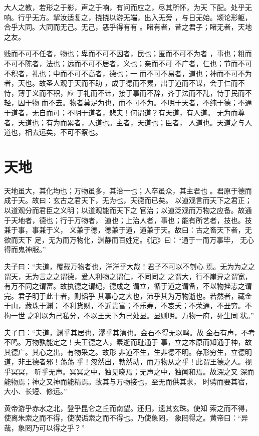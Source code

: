 \documentclass[12pt,UTF8]{ctexbook}
\begin{document}
大人之教，若形之于影，声之于响，有问而应之，尽其所怀，为天 下配。处乎无响。行乎无方。挈汝适复之，挠挠以游无端，出入无旁 ，与日无始。颂论形躯，合乎大同。大同而无己。无己，恶乎得有有 。睹有者，昔之君子；睹无者，天地之友。

贱而不可不任者，物也；卑而不可不因者，民也；匿而不可不为者 ，事也；粗而不可不陈者，法也；远而不可不居者，义也；亲而不可 不广者，仁也；节而不可不积者，礼也；中而不可不高者，德也；一 而不可不易者，道也；神而不可不为者，天也。故圣人观于天而不助 ，成于德而不累，出于道而不谋，会于仁而不恃，薄于义而不积，应 于礼而不讳，接于事而不辞，齐于法而不乱，恃于民而不轻，因于物 而不去。物者莫足为也，而不可不为。不明于天者，不纯于德；不通 于道者，无自而可；不明于道者，悲夫！何谓道？有天道，有人道。 无为而尊者，天道也；有为而累者，人道也。主者，天道也；臣者， 人道也。天道之与人道也，相去远矣，不可不察也。

\section{天地}

天地虽大，其化均也；万物虽多，其治一也；人卒虽众，其主君也 。君原于德而成于天。故曰：玄古之君天下，无为也，天德而已矣。 以道观言而天下之君正；以道观分而君臣之义明；以道观能而天下之 官治；以道泛观而万物之应备。故通于天地者，德也；行于万物者， 道也；上治人者，事也；能有所艺者，技也。技兼于事，事兼于义， 义兼于德，德兼于道，道兼于天。故曰：古之畜天下者，无欲而天下 足，无为而万物化，渊静而百姓定。《记》曰：“通于一而万事毕， 无心得而鬼神服。”

夫子曰：“夫道，覆载万物者也，洋洋乎大哉！君子不可以不刳心 焉。无为为之之谓天，无为言之之谓德，爱人利物之谓仁，不同同之 之谓大，行不崖异之谓宽，有万不同之谓富。故执德之谓纪，德成之 谓立，循于道之谓备，不以物挫志之谓完。君子明于此十者，则韬乎 其事心之大也，沛乎其为万物逝也。若然者，藏金于山，藏珠于渊； 不利货财，不近贵富；不乐寿，不哀夭；不荣通，不丑穷。不拘一世 之利以为己私分，不以王天下为己处显。显则明。万物一府，死生同 状。”

夫子曰：“夫道，渊乎其居也，漻乎其清也。金石不得无以鸣。故 金石有声，不考不鸣。万物孰能定之！夫王德之人，素逝而耻通于 事，立之本原而知通于神，故其德广。其心之出，有物采之。故形 非道不生，生非德不明。存形穷生，立德明道，非王德者邪！荡荡 乎！忽然出，勃然动，而万物从之乎！此谓王德之人。视乎冥冥， 听乎无声。冥冥之中，独见晓焉；无声之中，独闻和焉。故深之又 深而能物焉；神之又神而能精焉。故其与万物接也，至无而供其求， 时骋而要其宿，大小、长短、修远。”

黄帝游乎赤水之北，登乎昆仑之丘而南望。还归，遗其玄珠。使知 索之而不得，使离朱索之而不得，使喫诟索之而不得也。乃使象罔， 象罔得之。黄帝曰：“异哉，象罔乃可以得之乎？”
\end{document}
